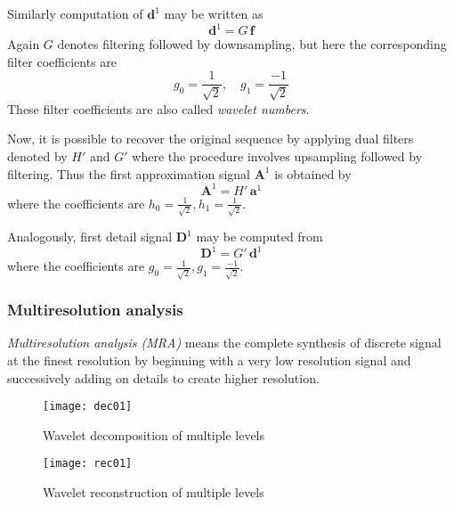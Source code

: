 \documentclass[a4paper,11pt]{report}
\begin{document}
Similarly computation of $\mathbf{d}^{1}$ may be written as
\begin{equation}
\mathbf{d}^{1} = G \,\mathbf{f}
\end{equation}
Again $G$ denotes filtering followed by downsampling, but here the corresponding filter coefficients are 
\begin{displaymath}
g_{0}=\frac{1}{\sqrt{2}}, \quad g_{1}=\frac{-1}{\sqrt{2}}
\end{displaymath}
These filter coefficients are also called \emph{wavelet numbers}.

Now, it is possible to recover the original sequence by applying dual filters denoted by $H'$ and $G'$ where the procedure involves upsampling followed by filtering. Thus the first approximation signal $\mathbf{A}^{1}$ is obtained by 
\begin{equation}
\mathbf{A}^{1} = H'\,\mathbf{a}^{1}
\end{equation}
where the coefficients are $h_{0}=\frac{1}{\sqrt{2}}, h_{1}=\frac{1}{\sqrt{2}}$.

Analogously, first detail signal $\mathbf{D}^{1}$ may be computed from
 \begin{equation}
\mathbf{D}^{1} = G'\,\mathbf{d}^{1}
\end{equation}
where the coefficients are $g_{0}=\frac{1}{\sqrt{2}}, g_{1}=\frac{-1}{\sqrt{2}}$.


\subsubsection{Multiresolution analysis}
\emph{Multiresolution analysis (MRA)} means the complete synthesis of discrete signal at the finest resolution by beginning with a very low resolution signal and successively adding on details to create higher resolution. \cite{walker}

\begin{figure}[h]
\centering
\texttt{[image: dec01]}
\caption{Wavelet decomposition of multiple levels} \label{dec01}
\end{figure}

\begin{figure}[h]
\centering
\texttt{[image: rec01]}
\caption{Wavelet reconstruction of multiple levels} \label{rec01}
\end{figure}
\end{document}
